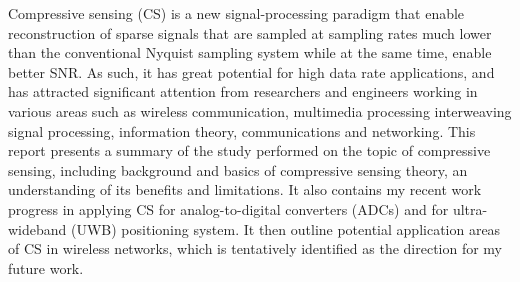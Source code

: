 Compressive sensing (CS) is a new signal-processing paradigm that enable reconstruction of sparse signals that are sampled at sampling rates much lower than the conventional Nyquist sampling system while at the same time, enable better SNR. As such, it has great potential for high data rate applications, and has attracted significant attention from researchers and engineers working in various areas such as wireless communication, multimedia processing interweaving signal processing, information theory, communications and networking. This report presents a summary of the study performed on the topic of compressive sensing, including background and basics of compressive sensing theory, an understanding of its benefits and limitations. It also contains my recent work progress in applying CS for analog-to-digital converters (ADCs) and for ultra-wideband (UWB) positioning system. It then outline potential application areas of CS in wireless networks, which is tentatively identified as the direction for my future work.

